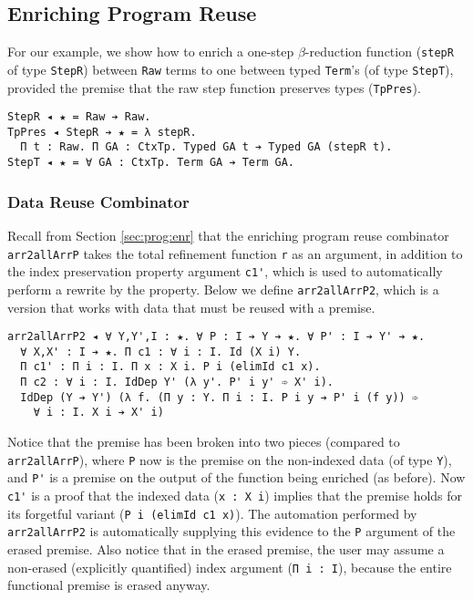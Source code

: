 \documentclass[acmsmall]{acmart}\settopmatter{}
\newcommand{\refsec}[1]{Section \ref{sec:#1}}
\newcommand{\labsec}[1]{\label{sec:#1}}
\begin{document}
\subsection{Enriching Program Reuse}
\labsec{rel:penr}

For our example, we show how to enrich a one-step $\beta$-reduction
function (\verb;stepR; of type \verb;StepR;) between \verb;Raw; terms to one
between typed \verb;Term;'s (of type \verb;StepT;), provided the
premise that the raw step function preserves types (\verb;TpPres;).
\begin{verbatim}
StepR ◂ ★ = Raw ➔ Raw.
TpPres ◂ StepR ➔ ★ = λ stepR. 
  Π t : Raw. Π GA : CtxTp. Typed GA t ➔ Typed GA (stepR t).
StepT ◂ ★ = ∀ GA : CtxTp. Term GA ➔ Term GA.
\end{verbatim}

\subsubsection{Data Reuse Combinator}

Recall from \refsec{prog:enr} that the enriching program reuse
combinator \verb;arr2allArrP; takes the total refinement function \verb;r;
as an argument, in addition to the index preservation property
argument \verb;c1';, which is used to automatically perform a rewrite
by the property. Below we define \verb;arr2allArrP2;, which is a
version that works with data that must be reused with a premise.
\begin{verbatim}
arr2allArrP2 ◂ ∀ Y,Y',I : ★. ∀ P : I ➔ Y ➔ ★. ∀ P' : I ➔ Y' ➔ ★.
  ∀ X,X' : I ➔ ★. Π c1 : ∀ i : I. Id (X i) Y.
  Π c1' : Π i : I. Π x : X i. P i (elimId c1 x).
  Π c2 : ∀ i : I. IdDep Y' (λ y'. P' i y' ➾ X' i).
  IdDep (Y ➔ Y') (λ f. (Π y : Y. Π i : I. P i y ➔ P' i (f y)) ➾
    ∀ i : I. X i ➔ X' i)
\end{verbatim}
Notice that the premise has been broken into two pieces (compared to
\verb;arr2allArrP;), where \verb;P; now is the premise on the
non-indexed data (of type \verb;Y;), and \verb;P'; is a premise on the
output of the function being enriched (as before). Now \verb;c1'; is a
proof that the indexed data (\verb;x : X i;) implies that the premise
holds for its forgetful variant (\verb;P i (elimId c1 x);). The
automation performed by \verb;arr2allArrP2; is automatically supplying
this evidence to the \verb;P; argument of the erased premise. Also
notice that in the erased premise, the user may assume a non-erased
(explicitly quantified) index argument (\verb;Π i : I;), because the
entire functional premise is erased anyway.
\end{document}
